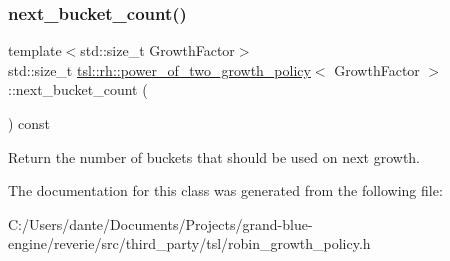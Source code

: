 \subsubsection{\texorpdfstring{next\_bucket\_count()}{next\_bucket\_count()}}
{\footnotesize\ttfamily template$<$std\+::size\+\_\+t Growth\+Factor$>$ \\
std\+::size\+\_\+t \mbox{\hyperlink{classtsl_1_1rh_1_1power__of__two__growth__policy}{tsl\+::rh\+::power\+\_\+of\+\_\+two\+\_\+growth\+\_\+policy}}$<$ Growth\+Factor $>$\+::next\+\_\+bucket\+\_\+count (\begin{DoxyParamCaption}{ }\end{DoxyParamCaption}) const\hspace{0.3cm}{\ttfamily [inline]}}

Return the number of buckets that should be used on next growth. 

The documentation for this class was generated from the following file\+:\begin{DoxyCompactItemize}
\item 
C\+:/\+Users/dante/\+Documents/\+Projects/grand-\/blue-\/engine/reverie/src/third\+\_\+party/tsl/robin\+\_\+growth\+\_\+policy.\+h\end{DoxyCompactItemize}
